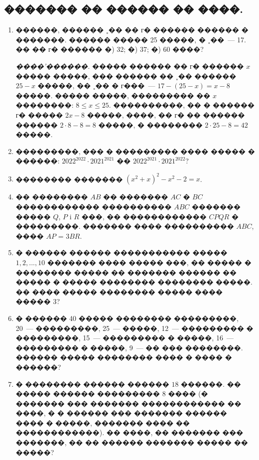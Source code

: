 \documentclass[a4paper,12pt]{article}
\begin{document}
\newpage

\begin{center}
\section*{������� �� ������ �� ����.}
\end{center}

\medskip\medskip\medskip

\begin{enumerate}
\item ������, ������ ˳�� �� г� ������ ������ � �������. ������ ����� 25 �����, � ˳��~--- 17. �� �� г� ������ �) 32; �) 37; �) 60 ����?

\textit{����'������.} ����� ������ �� г� ������ $x$ ����� �����, ��� ������ �� ˳�� ������ $25-x$ �����, �� ˳�� � г���~--- $17-(25-x)=x-8$ �����. ����� �����, ��������� �� $x$ ��������: $8\leq x \leq 25$. ����������, �� � ������ г� ����� $2x-8$ �����, ����, �� г� �� ������ ������ $2\cdot 8 - 8= 8$ �����, � �������� $2\cdot 25 - 8= 42$ �����.

\item ���������, ��� � ��������� ���� ����� � ������: $2022^{2022}\cdot 2021^{2021}$ �� $2022^{2021}\cdot 2021^{2022}$?

\item �������� ������� $(x^{2}+x)^{2}-x^{2}-2=x$.

\item �� �������� $AB$ �� ������� $AC$ � $BC$ ������������ ���������� $ABC$ ������� ����� $Q$, $P$ i $R$ ���, �� ������������ $CPQR$ � ���������. ������� ���� ���������� $ABC$, ���� $AP$ = $3BR$.

\item � ������ ������ ����������� ����� $1, 2, ... , 10$ ������� ���� ����� ���, ��
����� � �������� ����� �� ������� ������ �� ����� � ����� �������� �������� �����. ��
���� ����� �������� ����� ���� ����� $3$?

\item � ������ 40 ����� �������� ���������, 20~--- ���������, 25~--- �����, 12~--- ��������� � ���������, 15~--- ��������� � �����, 16~--- ��������� � �����, 9~--- �� ��� ��������. ������ ����� �������� ���� � ���� � ������?


\item � �������� ������ ������ $18$ ������. �� ����� ������ ��������� $8$ ���� (� ������� ��� ������� ������������ �� ����, � � ������ ��� ������� ������ ���� � �����, ������� ���� �� ������������). �� ����, �� ������� ��� �������, �� �� ������ ������� ����� �� �����?


\end{enumerate}
\end{document}
